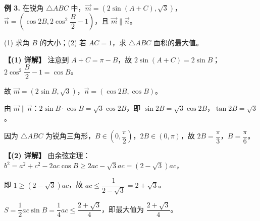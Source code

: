 \documentclass[UTF8,10pt,aspectratio=169]{ctexbeamer}
\begin{document}
	\begin{frame}
		\textbf{例 3.} 在锐角 $\triangle ABC$ 中，$\vec{m} = (2\sin(A+C), \sqrt{3})$，$\vec{n} = \left(\cos 2B, 2\cos^2\dfrac{B}{2} - 1\right)$，且 $\vec{m} \parallel \vec{n}$。
		
		(1) 求角 $B$ 的大小；\quad (2) 若 $AC = 1$，求 $\triangle ABC$ 面积的最大值。
		
		\pause
		\vspace{0.2cm}
		\textbf{【(1) 详解】} 注意到 $A + C = \pi - B$，故 $2\sin(A+C) = 2\sin B$；$2\cos^2\dfrac{B}{2} - 1 = \cos B$。
		
		\vspace{0.1cm}
		故 $\vec{m} = (2\sin B, \sqrt{3})$，$\vec{n} = (\cos 2B, \cos B)$。
		
		\vspace{0.1cm}
		由 $\vec{m} \parallel \vec{n}$：$2\sin B \cdot \cos B = \sqrt{3}\cos 2B$，即 $\sin 2B = \sqrt{3}\cos 2B$，$\tan 2B = \sqrt{3}$。
		
		\vspace{0.1cm}
		因为 $\triangle ABC$ 为锐角三角形，$B \in (0, \dfrac{\pi}{2})$，$2B \in (0, \pi)$，故 $2B = \dfrac{\pi}{3}$，$\boxed{B = \dfrac{\pi}{6}}$。
		
		\pause
		\vspace{0.2cm}
		\textbf{【(2) 详解】} 由余弦定理：$b^2 = a^2 + c^2 - 2ac\cos B \geq 2ac - \sqrt{3}ac = (2-\sqrt{3})ac$，
		
		\vspace{0.1cm}
		即 $1 \geq (2-\sqrt{3})ac$，故 $ac \leq \dfrac{1}{2-\sqrt{3}} = 2+\sqrt{3}$。
		
		\vspace{0.1cm}
		$S = \dfrac{1}{2}ac\sin B = \dfrac{1}{4}ac \leq \dfrac{2+\sqrt{3}}{4}$，即最大值为 $\boxed{\dfrac{2+\sqrt{3}}{4}}$。
	\end{frame}
	
\end{document}
